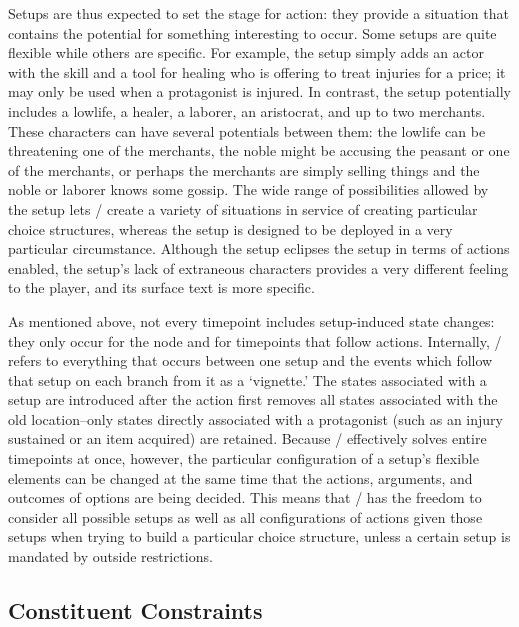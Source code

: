 Setups are thus expected to set the stage for action: they provide a situation that contains the potential for something interesting to occur.
%
Some setups are quite flexible while others are specific.
%
For example, the  setup simply adds an actor with the  skill and a tool for healing who is offering to treat injuries for a price; it may only be used when a protagonist is injured.
%
In contrast, the  setup potentially includes a lowlife, a healer, a laborer, an aristocrat, and up to two merchants.
%
These characters can have several potentials between them: the lowlife can be threatening one of the merchants, the noble might be accusing the peasant or one of the merchants, or perhaps the merchants are simply selling things and the noble or laborer knows some gossip.
%
The wide range of possibilities allowed by the  setup lets \dunyazad/ create a variety of situations in service of creating particular choice structures, whereas the  setup is designed to be deployed in a very particular circumstance.
%
Although the  setup eclipses the  setup in terms of actions enabled, the  setup's lack of extraneous characters provides a very different feeling to the player, and its surface text is more specific.


As mentioned above, not every timepoint includes setup-induced state changes: they only occur for the  node and for timepoints that follow  actions.
%
Internally, \dunyazad/ refers to everything that occurs between one setup and the  events which follow that setup on each branch from it as a `vignette.'
%
The states associated with a setup are introduced after the  action first removes all states associated with the old location--only states directly associated with a protagonist (such as an injury sustained or an item acquired) are retained.
%
Because \dunyazad/ effectively solves entire timepoints at once, however, the particular configuration of a setup's flexible elements can be changed at the same time that the actions, arguments, and outcomes of options are being decided.
%
This means that \dunyazad/ has the freedom to consider all possible setups as well as all configurations of actions given those setups when trying to build a particular choice structure, unless a certain setup is mandated by outside restrictions.


\subsection{Constituent Constraints}

